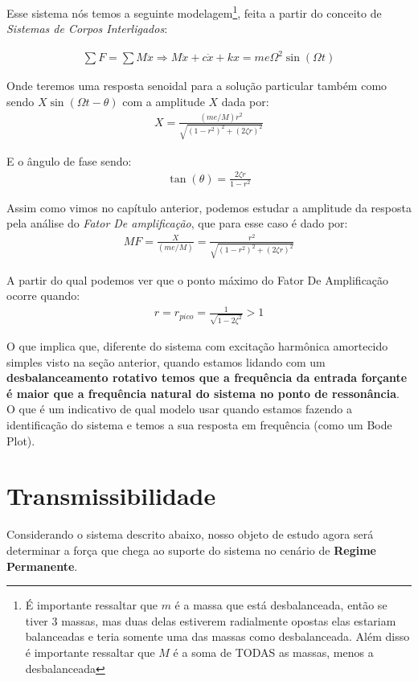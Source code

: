 \documentclass{article}
\begin{document}
Esse sistema nós temos a seguinte modelagem\footnote{É importante ressaltar que $m$ é a massa que está desbalanceada, então se tiver 3 massas, mas duas delas estiverem radialmente opostas
    elas estariam balanceadas e teria somente uma das massas como desbalanceada. Além disso é importante ressaltar que $M$ é a soma de TODAS as massas, menos a desbalanceada}, feita a partir
do conceito de \emph{Sistemas de Corpos Interligados}:

\begin{align}
    \sum F = \sum M \ddot x \Rightarrow M\ddot x + c \dot x + kx = me\Omega^2 \sin(\Omega t)
\end{align}

Onde teremos uma resposta senoidal para a solução particular também como sendo $X \sin{(\Omega t - \theta)}$ com a amplitude $X$ dada por:
\begin{align}
    X = \frac{(me/M) r^2}{\sqrt{(1-r^2)^2 + (2\zeta r)^2}}
\end{align}

E o ângulo de fase sendo:
\begin{align}
    \tan{(\theta)} = \frac{2\zeta r}{ 1 - r^2}
\end{align}

Assim como vimos no capítulo anterior, podemos estudar a amplitude da resposta pela análise do \emph{Fator De amplificação}, que para esse caso é dado por:
\begin{align}
    MF = \frac{X}{(me/M)} = \frac{r^2}{\sqrt{(1-r^2)^2 + (2\zeta r )^2}}
\end{align}

A partir do qual podemos ver que o ponto máximo do Fator De Amplificação ocorre quando:
\begin{align}
    r = r_{pico} = \frac{1}{\sqrt{1 - 2\zeta^2}} > 1
\end{align}

O que implica que, diferente do sistema com excitação harmônica amortecido simples visto na seção anterior, quando estamos lidando com um \textbf{desbalanceamento rotativo temos que a frequência da
    entrada forçante é maior que a frequência natural do sistema no ponto de ressonância}. O que é um indicativo de qual modelo usar quando estamos fazendo a identificação do sistema e temos a sua resposta em
frequência (como um Bode Plot).
\newpage

\section{Transmissibilidade}
Considerando o sistema descrito abaixo, nosso objeto de estudo agora será determinar a força que chega ao suporte do sistema no cenário de \textbf{Regime Permanente}.
\end{document}
